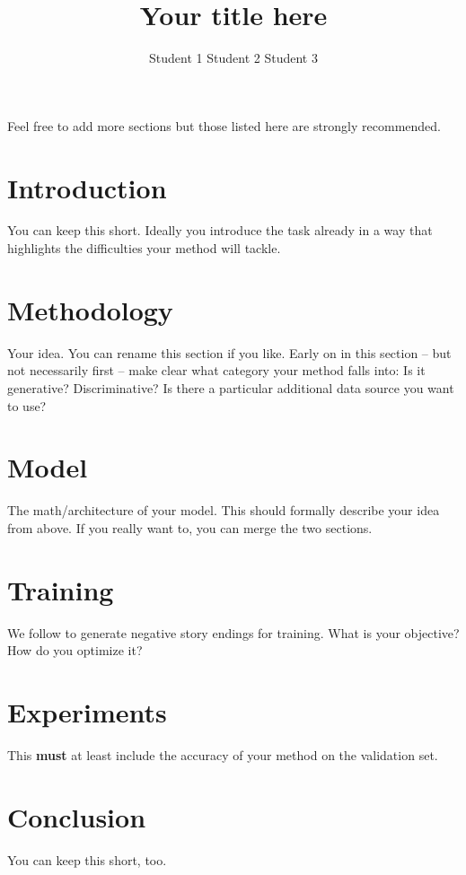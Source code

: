 \documentclass{article}
\title{Your title here}
\author{Student 1 \qquad Student 2 \qquad Student 3}
\begin{document}

\maketitle


Feel free to add more sections but those listed here are strongly recommended.
\section{Introduction}
You can keep this short. Ideally you introduce the task already in a way that highlights the difficulties your method will tackle.
\section{Methodology}
Your idea. You can rename this section if you like. Early on in this section -- but not necessarily first -- make clear what category your method falls into: Is it generative? Discriminative? Is there a particular additional data source you want to use?
\section{Model}
The math/architecture of your model. This should formally describe your idea from above. If you really want to, you can merge the two sections.
\section{Training}
We follow \citep{Roe2017} to generate negative story endings for training.
What is your objective? How do you optimize it?

\section{Experiments}
This {\bf must} at least include the accuracy of your method on the validation set.
\section{Conclusion}
You can keep this short, too.



\end{document}
